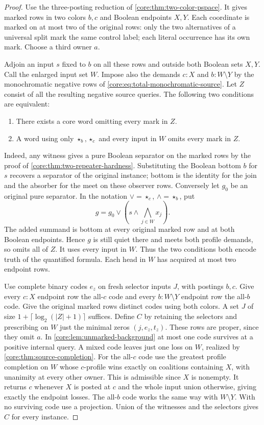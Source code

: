 \begin{proof}
Use the three-posting reduction of \cref{core:thm:two-color-pspace}.
It gives marked rows in two colors $b,c$ and Boolean endpoints
$X,Y$. Each coordinate is marked on at most two of the original
rows: only the two alternatives of a universal split mark the
same control label; each literal occurrence has its own mark.
Choose a third owner $a$.

Adjoin an input $s$ fixed to $b$ on all these rows and outside both
Boolean sets $X,Y$. Call the enlarged input set $W$. Impose also
the demands $c:X$ and $b:W\setminus Y$ by the monochromatic
negative rows of \eqref{core:eq:total-monochromatic-source}.
Let $Z$ consist of all the resulting negative source queries.
The following two conditions are equivalent:
\begin{enumerate}
\item There exists a core word omitting every mark in $Z$.
\item A word using only $\star_b,\star_c$ and every input in $W$
omits every mark in $Z$.
\end{enumerate}
Indeed, any witness
gives a pure Boolean separator on the marked rows by the proof of
\cref{core:thm:two-repeater-hardness}. Substituting the Boolean
bottom $b$ for $s$ recovers a separator of the original instance;
bottom is the identity for the join and the absorber for the meet
on these observer rows. Conversely let $g_0$ be an original pure
separator. In the notation $\vee=\star_c$, $\wedge=\star_b$, put
\[
               g=g_0\vee\left(s\wedge\bigwedge_{j\in W}x_j\right).
\]
The added summand is bottom at every original marked row and at
both Boolean endpoints. Hence $g$ is still quiet there and meets
both profile demands, so omits all of $Z$. It uses every input in
$W$. Thus the two conditions both encode truth of the quantified
formula. Each head in $W$ has acquired at most two endpoint rows.

Use complete binary codes $e_z$ on fresh selector inputs $J$, with
postings $b,c$. Give every $c:X$ endpoint row the all-$c$ code and
every $b:W\setminus Y$ endpoint row the all-$b$ code. Give the
original marked rows distinct codes using both colors. A set $J$ of
size $1+\lceil\log_2(|Z|+1)\rceil$ suffices.
Define $C$ by retaining the selectors and prescribing on $W$
just the minimal zeros $(j,e_z,t_z)$. These rows are proper, since
they omit $a$. In \cref{core:lem:unmarked-background} at most one
code survives at a positive internal query. A mixed code leaves
just one loss on $W$, realized by \cref{core:thm:source-completion}.
For the all-$c$ code use the greatest profile completion on $W$
whose $c$-profile wins exactly on coalitions containing $X$, with
unanimity at every other owner. This is admissible since $X$ is
nonempty. It returns $c$ whenever $X$ is posted at $c$ and the
whole input union otherwise, giving exactly the endpoint losses.
The all-$b$ code works the same way with $W\setminus Y$.
With no surviving code use a projection. Union of the witnesses
and the selectors gives $C$ for every instance.


\end{proof}
